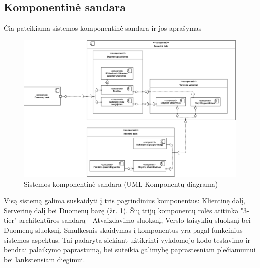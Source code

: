 \documentclass{VUMIFPSkursinis}
\begin{document}
      \subsection{Komponentinė sandara}
      Čia pateikiama sistemos komponentinė sandara ir jos aprašymas
        \begin{figure}[H]
          \centering
          \includegraphics[scale=0.45]{img/Komponentai}
          \caption{Sistemos komponentinė sandara (UML Komponentų diagrama)}
          \label{components}
        \end{figure}
        Visą sistemą galima suskaidyti į tris pagrindinius komponentus: Klientinę dalį, Serverinę dalį bei Duomenų bazę (žr. \ref{components}). Šių trijų komponentų rolės atitinka "3-tier" architektūros sandarą - Atvaizdavimo sluoksnį, Verslo taisyklių sluoksnį bei Duomenų sluoksnį. Smulkesnis skaidymas į komponentus yra pagal funkcinius sistemos aspektus. Tai padaryta siekiant užtikrinti vykdomojo kodo testavimo ir bendrai palaikymo paprastumą, bei suteikia galimybę paprastesniam plečiamumui bei lankstensiam diegimui. 
\end{document}
